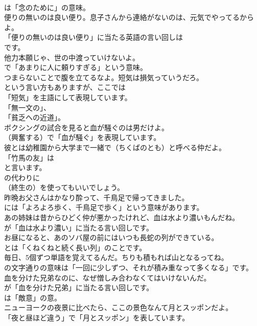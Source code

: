 \documentclass[8pt]{extreport}
\begin{document}
\begin{CJK}{UTF8}{min}
\\	は「念のために」の意味。	
\\	便りの無いのは良い便り。息子さんから連絡がないのは、元気でやってるからよ。 
\\	「便りの無いのは良い便り」に当たる英語の言い回しは
\\	です。	
\\	他力本願じゃ、世の中渡っていけないよ。 
\\	で「あまりに人に頼りすぎる」という意味。	
\\	つまらないことで腹を立てるなよ。短気は損気っていうだろ。 
\\	という言い方もありますが、ここでは
\\	「短気」を主語にして表現しています。
\\	「無一文の」、
\\	「貧乏への近道」。	
\\	ボクシングの試合を見ると血が騒ぐのは男だけよ。 
\\	（興奮する）で「血が騒ぐ」を表現しています。	
\\	彼とは幼稚園から大学まで一緒で（ちくばのとも）と呼べる仲だよ。 
\\	「竹馬の友」は
\\	と言います。
\\	の代わりに
\\	（終生の）を使ってもいいでしょう。	
\\	昨晩お父さんはかなり酔って、千鳥足で帰ってきました。 
\\	には「よろよろ歩く、千鳥足で歩く」という意味があります。	
\\	あの姉妹は昔からひどく仲が悪かったけれど、血は水より濃いもんだね。 
\\	が「血は水より濃い」に当たる言い回しです。	
\\	お昼になると、あのソバ屋の前にはいつも長蛇の列ができている。 
\\	とは「くねくねと続く長い列」のことです。	
\\	毎日、5個ずつ単語を覚えてるんだ。ちりも積もれば山となるってね。 
\\	の文字通りの意味は「一回に少しずつ、それが積み重なって多くなる」です。	
\\	血を分けた兄弟なのに、なぜ憎しみ合わなくてはいけないんだ。 
\\	が「血を分けた兄弟」に当たる言い回しです。
\\	は「敵意」の意。	
\\	ニューヨークの夜景に比べたら、ここの景色なんて月とスッポンだよ。 
\\	「夜と昼ほど違う」で「月とスッポン」を表しています。	

\end{CJK}
\end{document}
